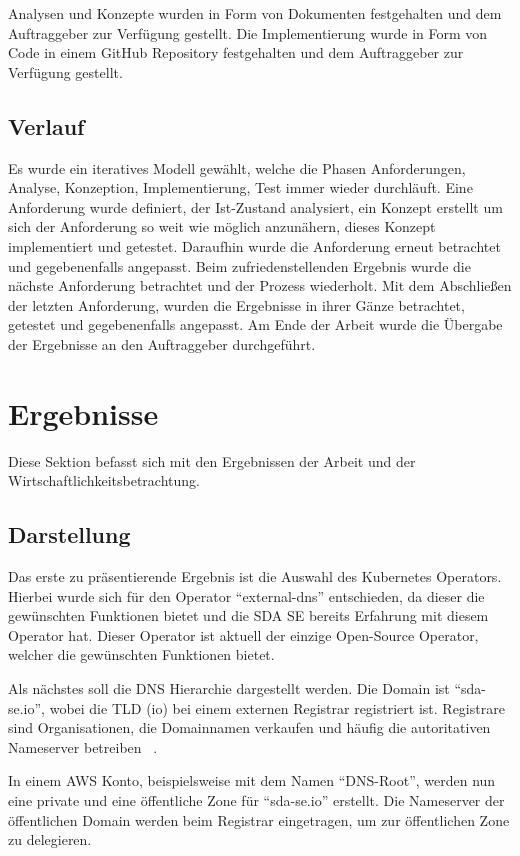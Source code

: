 Analysen und Konzepte wurden in Form von Dokumenten festgehalten und dem Auftraggeber zur Verfügung gestellt.
Die Implementierung wurde in Form von Code in einem GitHub Repository festgehalten und dem Auftraggeber zur Verfügung gestellt.

\subsection{Verlauf}
\label{subsec:description:verlauf}
Es wurde ein iteratives Modell gewählt, welche die Phasen Anforderungen, Analyse, Konzeption, Implementierung, Test immer wieder durchläuft.
Eine Anforderung wurde definiert, der Ist-Zustand analysiert, ein Konzept erstellt um sich der Anforderung so weit wie möglich anzunähern, dieses Konzept implementiert und getestet.
Daraufhin wurde die Anforderung erneut betrachtet und gegebenenfalls angepasst.
Beim zufriedenstellenden Ergebnis wurde die nächste Anforderung betrachtet und der Prozess wiederholt.
Mit dem Abschließen der letzten Anforderung, wurden die Ergebnisse in ihrer Gänze betrachtet, getestet und gegebenenfalls angepasst.
Am Ende der Arbeit wurde die Übergabe der Ergebnisse an den Auftraggeber durchgeführt.

\section{Ergebnisse}
\label{sec:description:ergebnisse}
Diese Sektion befasst sich mit den Ergebnissen der Arbeit und der Wirtschaftlichkeitsbetrachtung.

\subsection{Darstellung}
\label{subsec:description:darstellung}
Das erste zu präsentierende Ergebnis ist die Auswahl des Kubernetes Operators.
Hierbei wurde sich für den Operator \enquote{external-dns} entschieden, da dieser die gewünschten Funktionen bietet und die SDA SE bereits Erfahrung mit diesem Operator hat.
Dieser Operator ist aktuell der einzige Open-Source Operator, welcher die gewünschten Funktionen bietet.
\medskip

Als nächstes soll die DNS Hierarchie dargestellt werden.
Die Domain ist \enquote{sda-se.io}, wobei die \ac{TLD} (io) bei einem externen Registrar registriert ist.
Registrare sind Organisationen, die Domainnamen verkaufen und häufig die autoritativen Nameserver betreiben ~\cite{chung2017understanding}.

In einem AWS Konto, beispielsweise mit dem Namen \enquote{DNS-Root}, werden nun eine private und eine öffentliche Zone für \enquote{sda-se.io} erstellt.
Die Nameserver der öffentlichen Domain werden beim Registrar eingetragen, um zur öffentlichen Zone zu delegieren.
\medskip

